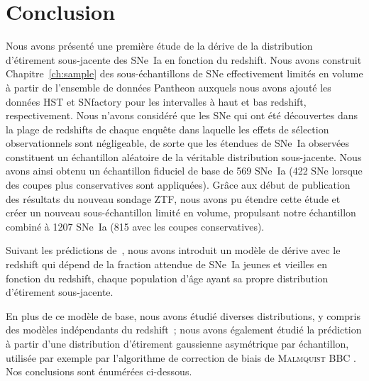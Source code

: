 \documentclass[../main/main.tex]{subfiles}
\begin{document}
\section{Conclusion}\label{ssec:xccl}

Nous avons présenté une première étude de la dérive de la distribution
d'étirement sous-jacente des SNe~Ia en fonction du redshift. Nous avons
construit Chapitre~\ref{ch:sample} des sous-échantillons de SNe effectivement
limités en volume à partir de l'ensemble de données Pantheon \citep[][SDSS, PS1,
SNLS]{scolnic2018} auxquels nous avons ajouté les données HST et SNfactory
\citep{rigault2020} pour les intervalles à haut et bas redshift, respectivement.
Nous n'avons considéré que les SNe qui ont été découvertes dans la plage de
redshifts de chaque enquête dans laquelle les effets de sélection
observationnels sont négligeable, de sorte que les étendues de SNe~Ia observées
constituent un échantillon aléatoire de la véritable distribution sous-jacente.
Nous avons ainsi obtenu un échantillon fiduciel de base de 569 SNe~Ia (422 SNe
lorsque des coupes plus conservatives sont appliquées). Grâce aux début de
publication des résultats du nouveau sondage ZTF, nous avons pu étendre cette
étude et créer un nouveau sous-échantillon limité en volume, propulsant notre
échantillon combiné à 1207 SNe~Ia (815 avec les coupes conservatives).

Suivant les prédictions de~\cite{rigault2020}, nous avons introduit un modèle de
dérive avec le redshift qui dépend de la fraction attendue de SNe~Ia
jeunes et vieilles en fonction du redshift, chaque population d'âge ayant sa
propre distribution d'étirement sous-jacente.

En plus de ce modèle de base, nous avons étudié diverses distributions, y
compris des modèles indépendants du redshift~; nous avons également étudié la
prédiction à partir d'une distribution d'étirement gaussienne asymétrique par
échantillon, utilisée par exemple par l'algorithme de correction de biais de
\textsc{Malmquist} BBC \citep{scolnic2016, kessler2017}. Nos conclusions sont
énumérées ci-dessous.
\end{document}
